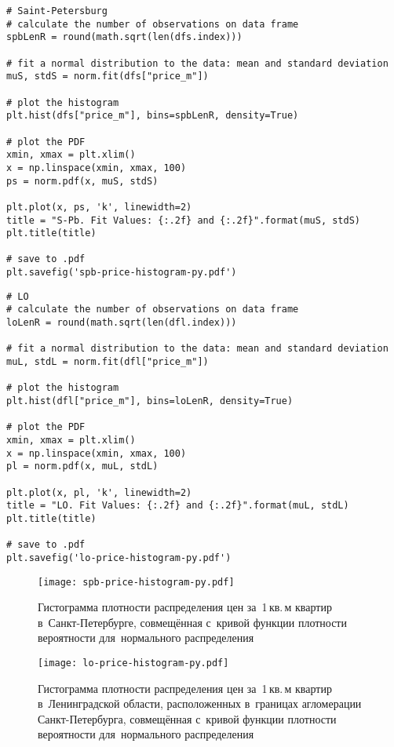 \documentclass[]{scrreprt}
\begin{document}
%
\begin{lstlisting}[float, caption = Построение гистограммы для~Санкт-Петербурга, firstnumber=1, label= lst:price-hist-spb]
# Saint-Petersburg
# calculate the number of observations on data frame
spbLenR = round(math.sqrt(len(dfs.index)))

# fit a normal distribution to the data: mean and standard deviation
muS, stdS = norm.fit(dfs["price_m"])

# plot the histogram
plt.hist(dfs["price_m"], bins=spbLenR, density=True)

# plot the PDF
xmin, xmax = plt.xlim()
x = np.linspace(xmin, xmax, 100)
ps = norm.pdf(x, muS, stdS)

plt.plot(x, ps, 'k', linewidth=2)
title = "S-Pb. Fit Values: {:.2f} and {:.2f}".format(muS, stdS)
plt.title(title)

# save to .pdf
plt.savefig('spb-price-histogram-py.pdf')
\end{lstlisting}
%
\begin{lstlisting}[float, caption = Построение гистограммы для~Ленингадской области, firstnumber=1, label= lst:price-hist-lo]
# LO
# calculate the number of observations on data frame
loLenR = round(math.sqrt(len(dfl.index)))

# fit a normal distribution to the data: mean and standard deviation
muL, stdL = norm.fit(dfl["price_m"])

# plot the histogram
plt.hist(dfl["price_m"], bins=loLenR, density=True)

# plot the PDF
xmin, xmax = plt.xlim()
x = np.linspace(xmin, xmax, 100)
pl = norm.pdf(x, muL, stdL)

plt.plot(x, pl, 'k', linewidth=2)
title = "LO. Fit Values: {:.2f} and {:.2f}".format(muL, stdL)
plt.title(title)

# save to .pdf
plt.savefig('lo-price-histogram-py.pdf')
\end{lstlisting} 
%
\begin{figure}[ht]
	\centering
	\texttt{[image: spb-price-histogram-py.pdf]}
	\caption{Гистограмма плотности распределения цен за~1\,кв.\,м квартир в~Санкт-Петербурге, совмещённая с~кривой функции плотности вероятности для~нормального распределения}
	\label{fig:spb-prices-hist}
\end{figure}
%
\begin{figure}[ht]
	\centering
	\texttt{[image: lo-price-histogram-py.pdf]}
	\caption{Гистограмма плотности распределения цен за~1\,кв.\,м квартир в~Ленинградской области, расположенных в~границах агломерации Санкт-Петербурга, совмещённая с~кривой функции плотности вероятности для~нормального распределения}
	\label{fig:lo-prices-hist}
\end{figure}
%
\end{document}
